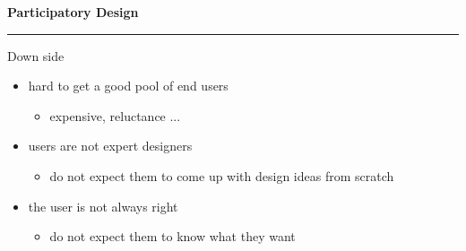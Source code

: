 \documentclass[pdf]{beamer}
\begin{document}
\begin{frame}
\vspace{8mm}
\textcolor{myBlue}{\textbf{\Large{Participatory Design}}}

\textcolor{red}{\rule{10cm}{1mm}}

\bigskip

{\LARGE Down side \LARGE}

\begin{itemize}
\item hard to get a good pool of end users
\begin{itemize}
\item expensive, reluctance ...
\newline
\end{itemize}

\item users are not expert designers
\begin{itemize}
\item do not expect them to come up with design ideas from scratch
\newline
\end{itemize}

\item
the user is not always right
\begin{itemize}
\item do not expect them to  know what they want
\end{itemize}

\end{itemize}

\bigskip
\bigskip
\bigskip

\end{frame}
\end{document}
